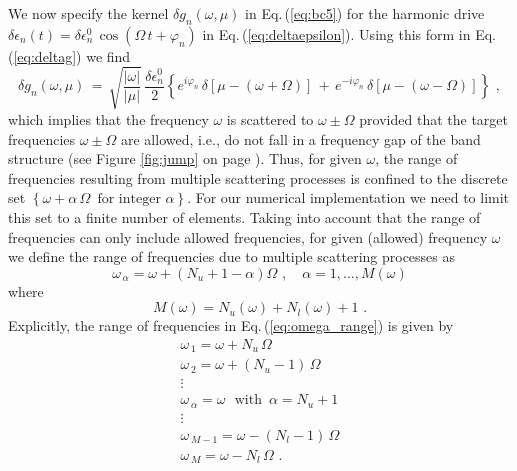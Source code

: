We now specify the kernel $\delta g_n(\omega, \mu)$ in Eq.\,(\ref{eq:bc5}) 
for the harmonic drive $\delta \epsilon_n(t) = \delta \epsilon_n^0 \, \cos(\Omega \, t + \varphi_n)$
in Eq.\,(\ref{eq:deltaepsilon}). Using this form in Eq.\,(\ref{eq:deltag}) we find
%
\begin{equation} \label{eq:deltag_harm}
\delta g_n(\omega, \mu) \, = \, \sqrt{\frac{|\omega|}{|\mu|}} \, \frac{\delta \epsilon_n^0}{2} 
\left\{
e^{i \varphi_n} \, \delta\left[\mu - (\omega + \Omega)\right] \, + \,  
e^{- i \varphi_n} \, \delta\left[\mu - (\omega - \Omega)\right]
\right\} \, \, ,
\end{equation}
%
which implies that the frequency $\omega$ is scattered to $\omega \pm \Omega$
provided that the target frequencies $\omega \pm \Omega$ are allowed, i.e., 
do not fall in a frequency gap of the band structure
(see Figure \ref{fig:jump} on page \pageref{fig:jump}). 
Thus, for given $\omega$, the range of frequencies resulting from multiple scattering 
processes is confined to the discrete set 
$\left\{\omega + \alpha \, \Omega \, \, \, \text{for integer} \, \, \alpha \right\}$. 
For our numerical implementation we need to limit this set to a finite number 
of elements. Taking into account that the range of frequencies can only include 
allowed frequencies, for given (allowed) frequency $\omega$ we define the range of 
frequencies due to multiple scattering processes as
%
\begin{equation} \label{eq:omega_range}
\omega_{\,\alpha} = \omega + \left( N_u + 1 - \alpha \right) \Omega \, \, , \quad \alpha = 1, \ldots, M(\omega)
\end{equation}
%
where 
%
\begin{equation} \label{eq:def_m}
M(\omega) = N_u(\omega) + N_l(\omega) + 1 \, \, .
\end{equation}
%
Explicitly, the range of frequencies in Eq.\,(\ref{eq:omega_range}) is given by 
%
\begin{equation} \label{eq:table}
\begin{array}{l}
\omega_{\,1} = \omega + N_u \, \Omega \\
\omega_{\,2} = \omega + (N_u - 1) \, \Omega \\
\vdots \\
\omega_{\,\alpha} = \omega \, \, \, \, \text{with} \, \, \, \alpha = N_u + 1 \\
\vdots \\
\omega_{\,M-1} = \omega - (N_l - 1) \, \Omega \\
\omega_{\,M} = \omega - N_l \, \Omega \, \, .
\end{array}
\end{equation}
